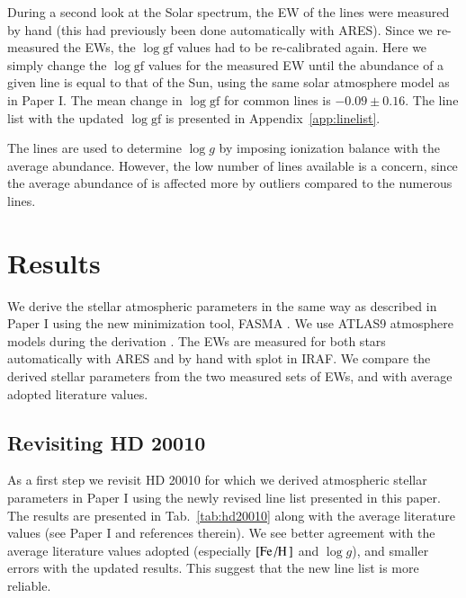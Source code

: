 \documentclass{aa}
\begin{document}
During a second look at the Solar spectrum, the EW of the lines were measured by
hand (this had previously been done automatically with ARES). Since we
re-measured the EWs, the $\log \mathrm{gf}$ values had to be re-calibrated
again. Here we simply change the $\log \mathrm{gf}$ values for the measured EW
until the abundance of a given line is equal to that of the Sun, using the same
solar atmosphere model as in Paper I. The mean change in $\log \mathrm{gf}$ for
common lines is $-0.09 \pm 0.16$. The line list with the updated $\log
\mathrm{gf}$ is presented in Appendix~\ref{app:linelist}.

The  lines are used to determine $\log g$ by imposing ionization
balance with the average  abundance. However, the low number of
 lines available is a concern, since the average abundance of
 is affected more by outliers compared to the numerous 
lines.



\section{Results}
\label{sec:results}

We derive the stellar atmospheric parameters in the same way as described in
Paper I using the new minimization tool, FASMA \citep{Andreasen2017a}. We use
ATLAS9 atmosphere models during the derivation \citep{Kurucz1993}. The EWs are
measured for both stars automatically with ARES \citep{Sousa2015a} and by hand
with splot in IRAF. We compare the derived stellar parameters from the two
measured sets of EWs, and with average adopted literature values.


\subsection{Revisiting HD 20010}
\label{sec:hd20010}

As a first step we revisit HD 20010 for which we derived atmospheric stellar
parameters in Paper I using the newly revised line list presented in this paper.
The results are presented in Tab.~\ref{tab:hd20010} along with the average
literature values (see Paper I and references therein). We see better agreement
with the average literature values adopted (especially $[\ion{Fe}/\ion{H}]$ and
$\log g$), and smaller errors with the updated results. This suggest that the
new line list is more reliable.
\end{document}
